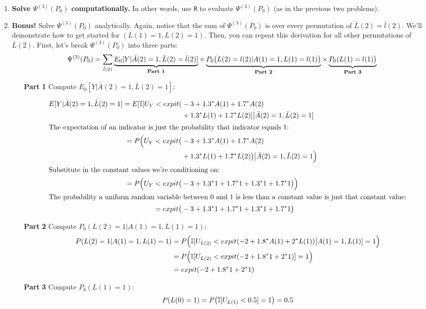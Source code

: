 \documentclass{exam}
\begin{document}
\begin{enumerate}
\begin{enumerate}

\item \textbf{Solve $\Psi^{(3)}(P_0)$ computationally.} In other words, use \texttt{R} to evaluate $\Psi^{(3)}(P_0)$ (as in the previous two problems).

\item \textbf{Bonus!} Solve $\Psi^{(3)}(P_0)$ analytically. Again, notice that the sum of $\Psi^{(3)}(P_0)$ is over every permutation of $\bar{L}(2) = \bar{l}(2)$. We'll demonstrate how to get started for $(L(1) = 1, L(2) = 1)$. Then, you can repeat this derivation for all other permutations of $\bar{L}(2)$. First, let's break $\Psi^{(3)}(P_0)$ into three parts:
\[
\Psi^{(3)}(P_0) = \sum_{\bar{l}(2)}\underbrace{E_0[Y | \bar{A}(2)=1, \bar{L}(2) = \bar{l}(2)]}_\text{\textbf{Part 1}} \times \underbrace{P_0\big{(}L(2) = l(2) | A(1)=1, L(1) = l(1)\big{)}}_\text{\textbf{Part 2}} \times \underbrace{P_0(L(1) = l(1)\big{)}}_\text{\textbf{Part 3}}
\]


\begin{enumerate}
\item[\textbf{Part}]\textbf{1} Compute $E_0[Y|\bar{A}(2)=1, \bar{L}(2) = 1]$:

\begin{align*}
E[Y|\bar{A}(2)=1, \bar{L}(2) = 1]  = E[\mathbb{I}[U_{Y}<expit(& -3+1.3^*A(1)+1.7^*A(2) \\
& + 1.3^*L(1)+1.7^*L(2)] \big{|} \bar{A}(2)=1, \bar{L}(2) = 1] \\
\intertext{The expectation of an indicator is just the probability that indicator equals 1:}
 =  P\Big{(}U_{Y}<expit\big{(}& -3+1.3^*A(1)+1.7^*A(2)\\
 & +1.3^*L(1)+1.7^*L(2)\big{)} \big{|} \bar{A}(2)=1, \bar{L}(2) = 1 \Big{)} \\
\intertext{Substitute in the constant values we're conditioning on:}
 = P\Big{(}U_{Y}<expit\big{(}& -3+1.3^*1+1.7^*1 +1.3^*1+1.7^*1\big{)}\Big{)} \\
\intertext{The probability a uniform random variable between $0$ and $1$ is less than a constant value is just that constant value:}
 = expit\big{(}&-3+1.3^*1+1.7^*1+ 1.3^*1+1.7^*1\big{)} \\
\end{align*}
\item[\textbf{Part}]\textbf{2} Compute $P_0(L(2) = 1 | A(1) = 1, L(1) = 1)$:
\begin{align*}
P(L(2) = 1 | A(1) = 1, L(1) = 1) & = P\Big{(}\mathbb{I}[U_{L(2)}<expit(-2+1.8^*A(1)+2^*L(1)) \big{|} A(1) = 1, L(1)] = 1\Big{)} \\
& =  P\Big{(}\mathbb{I}[U_{L(2)}<expit(-2+1.8^*1+2^*1)] = 1\Big{)} \\
& =  expit(-2+1.8^*1+2^*1)
\end{align*}
\item[\textbf{Part}]\textbf{3}  Compute $P_0(L(1) = 1)$:
\begin{align*}
P(L(0) = 1) & = P\big{(}\mathbb{I}[U_{L(1)} < 0.5] = 1\big{)} = 0.5 \\
\end{align*}


\end{enumerate}
\end{enumerate}
\end{enumerate}
\end{document}
